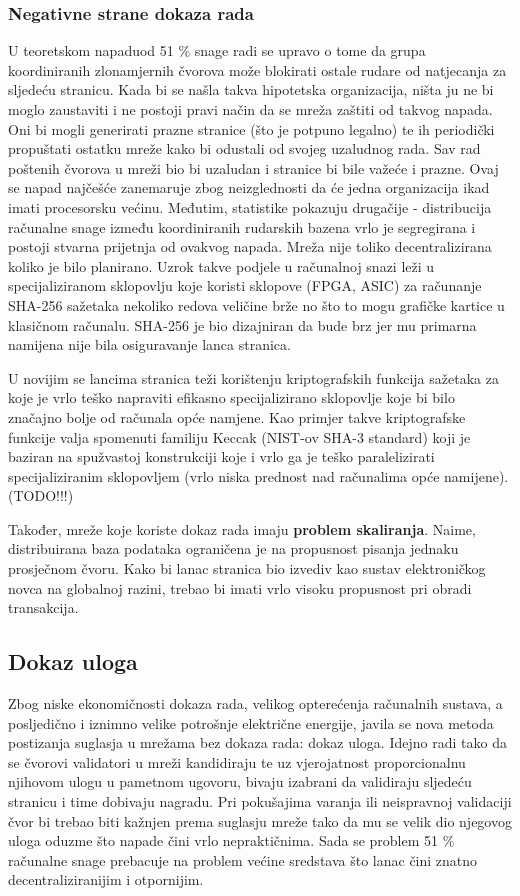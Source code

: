 \documentclass[utf8, zavrsni]{fer}
\begin{document}
\subsubsection{Negativne strane dokaza rada}
U teoretskom napadu\footnotemark od 51 \% snage radi se upravo o tome da grupa koordiniranih zlonamjernih čvorova može blokirati ostale rudare od natjecanja za sljedeću stranicu. Kada bi se našla takva hipotetska organizacija, ništa ju ne bi moglo zaustaviti i ne postoji pravi način da se mreža zaštiti od takvog napada. Oni bi mogli generirati prazne stranice (što je potpuno legalno) te ih periodički propuštati ostatku mreže kako bi odustali od svojeg uzaludnog rada. Sav rad poštenih čvorova u mreži bio bi uzaludan i stranice bi bile važeće i prazne. Ovaj se napad najčešće zanemaruje zbog neizglednosti da će jedna organizacija ikad imati procesorsku većinu. Međutim, statistike pokazuju drugačije - distribucija računalne snage između koordiniranih rudarskih bazena vrlo je segregirana i postoji stvarna prijetnja od ovakvog napada. Mreža nije toliko decentralizirana koliko je bilo planirano. Uzrok takve podjele u računalnoj snazi leži u specijaliziranom sklopovlju koje koristi sklopove (FPGA, ASIC) za računanje SHA-256 sažetaka nekoliko redova veličine brže no što to mogu grafičke kartice u klasičnom računalu. SHA-256 je bio dizajniran da bude brz jer mu primarna namijena nije bila osiguravanje lanca stranica.

U novijim se lancima stranica teži korištenju kriptografskih funkcija sažetaka za koje je vrlo teško napraviti efikasno specijalizirano sklopovlje koje bi bilo značajno bolje od računala opće namjene. Kao primjer takve kriptografske funkcije valja spomenuti familiju Keccak (NIST-ov SHA-3 standard) koji je baziran na spužvastoj konstrukciji koje i vrlo ga je teško paralelizirati specijaliziranim sklopovljem (vrlo niska prednost nad računalima opće namijene). (TODO!!!)

Također, mreže koje koriste dokaz rada imaju \textbf{problem skaliranja}. Naime, distribuirana baza podataka ograničena je na propusnost pisanja jednaku prosječnom čvoru. Kako bi lanac stranica bio izvediv kao sustav elektroničkog novca na globalnoj razini, trebao bi imati vrlo visoku propusnost pri obradi transakcija.

\subsection{Dokaz uloga}
Zbog niske ekonomičnosti dokaza rada, velikog opterećenja računalnih sustava, a posljedično i iznimno velike potrošnje električne energije, javila se nova metoda postizanja suglasja u mrežama bez dokaza rada: dokaz uloga. Idejno radi tako da se čvorovi validatori u mreži kandidiraju te uz vjerojatnost proporcionalnu njihovom ulogu u pametnom ugovoru, bivaju izabrani da validiraju sljedeću stranicu i time dobivaju nagradu. Pri pokušajima varanja ili neispravnoj validaciji čvor bi trebao biti kažnjen prema suglasju mreže tako da mu se velik dio njegovog uloga oduzme što napade čini vrlo nepraktičnima. Sada se problem 51 \% računalne snage prebacuje na problem većine sredstava što lanac čini znatno decentraliziranijim i otpornijim.
\end{document}
